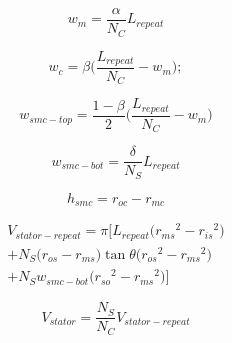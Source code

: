                 
                \begin{equation}
                    w_m = \frac{\alpha}{N_C} L_{repeat}
                    \label{eq:rsm/LFSM/w_m}
                \end{equation}
                
                
                \begin{equation}
                    w_c = \beta\bigg(\frac{L_{repeat}}{N_C}-w_m\bigg);
                    \label{eq:rsm/LFSM/w_c}
                \end{equation}
                
                
                \begin{equation}
                    w_{smc-top} = \frac{1-\beta}{2}\bigg(\frac{L_{repeat}}{N_C}-w_m\bigg)
                    \label{eq:rsm/LFSM/w_smc_top}
                \end{equation}
                
                
                \begin{equation}
                    w_{smc-bot} =  \frac{\delta }{N_S}L_{repeat}
                    \label{eq:rsm/LFSM/w_smc_bot}
                \end{equation}
                
                
                \begin{equation}
                    h_{smc} = r_{oc} - r_{mc}
                    \label{eq:rsm/LFSM/h_smc}
                \end{equation}
                
                
                \begin{equation}
                    \begin{array}{c}
                        V_{stator-repeat} = \pi \bigg[  L_{repeat}  \big({r_{ms}}^2-{r_{is}}^2\big)\\
                        + N_S  \big(r_{os}-r_{ms}\big) \tan{\theta} \big({r_{os}}^2-{r_{ms}}^2\big)\\
                        + N_S w_{smc-bot}\big( {r_{so}}^2 - {r_{ms}}^2 \big)\bigg]
                    \end{array}
                    \label{eq:rsm/LFSM/V_stator_repeat}
                \end{equation}
                
                
                \begin{equation}
                    V_{stator} = \frac{N_S}{N_C}V_{stator-repeat}
                    \label{eq:rsm/LFSM/V_stator}
                \end{equation}
                
